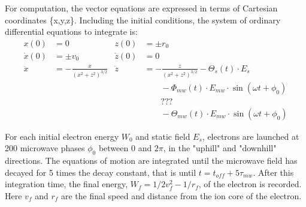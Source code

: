 \documentclass[aps,pra,preprint,groupedaddress]{revtex4-1}
\begin{document}
For computation, the vector equations are expressed in terms of Cartesian coordinates \{x,y,z\}. Including the initial conditions, the system of ordinary differential equations to integrate is:
\begin{align*}
x(0) & = 0 & z(0) & = \pm r_0 \\
\dot{x}(0) & = \pm v_0 & \dot{z}(0) & = 0 \\
\ddot{x} & = -\frac{x}{(x^2 + z^2)^{3/2}} & \ddot{z} & = -\frac{z}{(x^2 + z^2)^{3/2}} - \Theta_s(t) \cdot E_s \\
 & & & \quad \quad - \Phi_{mw}(t) \cdot E_{mw} \cdot \sin{(\omega t + \phi_0)} \\
 & & & \quad \quad \textbf{???} \\
 & & & \quad \quad - \Theta_{mw}(t) \cdot E_{mw} \cdot \sin{(\omega t + \phi_0)}
\end{align*}


For each initial electron energy $W_0$ and static field $E_s$, electrons are launched at 200 microwave phases $\phi_0$ between 0 and $2\pi$, in the "uphill" and "downhill" directions. The equations of motion are integrated until the microwave field has decayed for 5 times the decay constant, that is until  $t=t_{off} + 5\tau_{mw}$. After this integration time, the final energy, $W_f = 1/2 v_f^2 - 1/r_f$, of the electron is recorded. Here $v_f$ and $r_f$ are the final speed and distance from the ion core of the electron.
\end{document}
